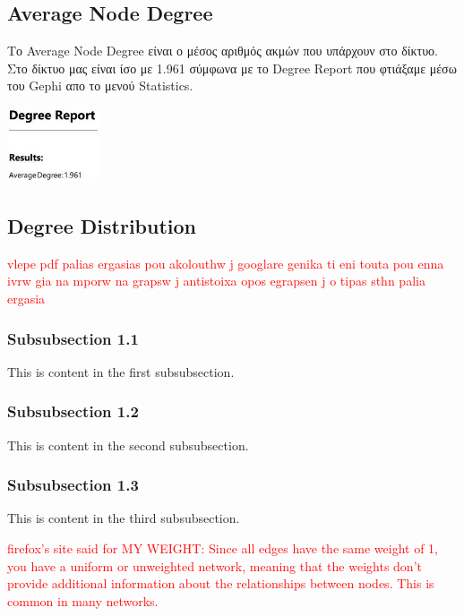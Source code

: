 \documentclass[12pt]{article}
\begin{document}
	\subsection{Average Node Degree}
	Το Average Node Degree είναι ο μέσος αριθμός ακμών που υπάρχουν στο δίκτυο. Στο δίκτυο μας είναι ίσο με 1.961 σύμφωνα με το Degree Report που φτιάξαμε μέσω του Gephi απο το μενού Statistics.
	\begin{center}
		\includegraphics[width=0.2\textwidth]{photos-files/section6/average_degree.JPG}
	\end{center}
	
	\newpage
	\subsection{Degree Distribution}
	\textcolor{red}{vlepe pdf palias ergasias pou akolouthw j googlare genika ti eni touta pou enna ivrw gia na mporw na grapsw j antistoixa opos egrapsen j o tipas sthn palia ergasia}
	\subsubsection{Subsubsection 1.1}
	This is content in the first subsubsection.
	
	\subsubsection{Subsubsection 1.2}
	This is content in the second subsubsection.
	
	\subsubsection{Subsubsection 1.3}
	This is content in the third subsubsection.
	
	\textcolor{red}{firefox's site said for MY WEIGHT: Since all edges have the same weight of 1, you have a uniform or unweighted network, meaning that the weights don't provide additional information about the relationships between nodes. This is common in many networks.}
		
	\label{chap:degree_measures_6}
	
	
\end{document}
